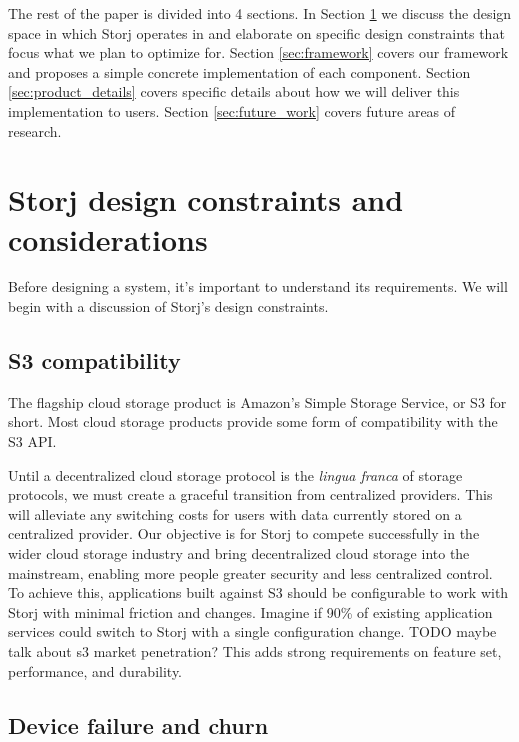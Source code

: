 \documentclass[a4paper,10pt]{article} \usepackage[utf8]{inputenc}
\newcommand{\todo}[1]{{\color{red} TODO #1 }}
\begin{document}
The rest of the paper is divided into 4
sections. In Section \ref{sec:design_constraints} we discuss the design space
in which Storj operates in and elaborate on specific design constraints that
focus what we plan to optimize for.
Section \ref{sec:framework} covers our framework and proposes a simple
concrete implementation of each component.
Section \ref{sec:product_details} covers specific details
about how we will deliver this implementation to users. Section
\ref{sec:future_work} covers future areas of research.

\section{Storj design constraints and
considerations}\label{sec:design_constraints}

Before designing a system, it's important to understand its requirements.
We will begin with a discussion of Storj's design constraints.

\subsection{S3 compatibility}

The flagship cloud storage product is Amazon's Simple Storage Service, or S3 for
short. Most cloud storage products provide some form of compatibility with the
S3 API.

Until a decentralized cloud storage protocol is the {\em lingua franca} of
storage protocols, we must create a graceful transition from centralized providers. 
This will alleviate any switching costs for users with data currently stored on 
a centralized provider.  Our objective is for Storj to compete successfully in the wider cloud storage 
industry and bring decentralized cloud storage into the mainstream, enabling 
more people greater security and less centralized control. To achieve this, 
applications built against S3 should be configurable to work with Storj with 
minimal friction and changes. Imagine if 90\% of existing application services 
could switch to Storj with a
single configuration change. \todo{maybe talk about s3 market penetration?} 
This adds strong requirements on feature set, performance, and durability.

\subsection{Device failure and churn}
\end{document}
